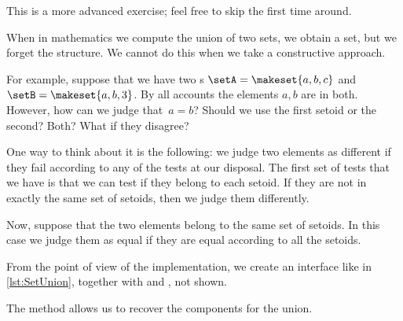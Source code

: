 \begin{remark}
    This is a more advanced exercise; feel free to skip the first time around.
\end{remark}

When in mathematics we compute the union of two sets, we obtain a set, but we forget the structure.
We cannot do this when we take a constructive approach.

For example, suppose that we have two \Setoid{}s $\setA = \makeset{a,b,c}$ and~$\setB = \makeset{a,b,3}$.
By all accounts the elements $a,b$ are in both.
However, how can we judge that~$a=b$?
Should we use the first setoid or the second?
Both?
What if they disagree?

One way to think about it is the following: we judge two elements as different if they fail according to any of the tests at our disposal.
The first set of tests that we have is that we can test if they belong to each setoid.
If they are not in exactly the same set of setoids, then we judge them differently.

Now, suppose that the two elements belong to the same set of setoids.
In this case we judge them as equal if they are equal according to all the setoids.




From the point of view of the implementation, we create an interface like in \cref{lst:SetUnion}, together with \EnumerableSetUnion and \FiniteSetUnion, not shown.


The method  allows us to recover the components for the union.


